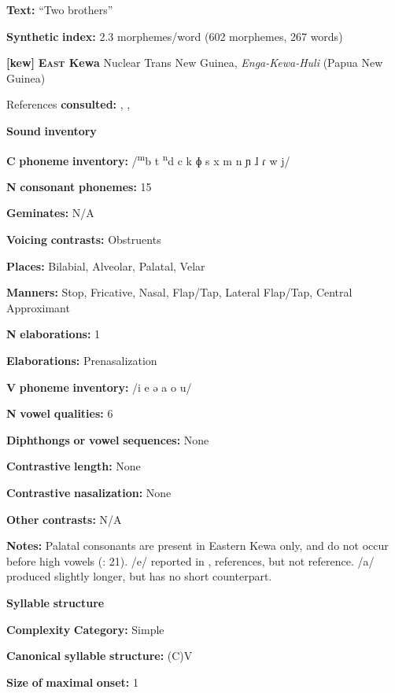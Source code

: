 \begin{styleBody}
\textbf{Text:} “Two brothers” \citep[92-97]{Vajda2004}

\textbf{Synthetic} \textbf{index:} 2.3 morphemes/word (602 morphemes, 267 words)

\textbf{[kew]}   \textbf{\textsc{East} \textbf{Kewa}}  Nuclear Trans New Guinea, \textit{Enga-Kewa-Huli} (Papua New Guinea)

References \textbf{consulted:} \citet{Franklin1971}, \citet{FranklinFranklin1962}, \citet{FranklinFranklin1978}

\textbf{Sound} \textbf{inventory}

\textbf{C} \textbf{phoneme} \textbf{inventory:} /\textsuperscript{m}b t \textsuperscript{n}d c k ɸ s x m n ɲ ɺ ɾ w j/

\textbf{N} \textbf{consonant} \textbf{phonemes:} 15

\textbf{Geminates:} N/A

\textbf{Voicing} \textbf{contrasts:} Obstruents

\textbf{Places:} Bilabial, Alveolar, Palatal, Velar

\textbf{Manners:} Stop, Fricative, Nasal, Flap/Tap, Lateral Flap/Tap, Central Approximant

\textbf{N} \textbf{elaborations:} 1

\textbf{Elaborations:} Prenasalization

\textbf{V} \textbf{phoneme} \textbf{inventory:} /i e ə a o u/

\textbf{N} \textbf{vowel} \textbf{qualities:} 6

\textbf{Diphthongs} \textbf{or} \textbf{vowel} \textbf{sequences:} None

\textbf{Contrastive} \textbf{length:} None

\textbf{Contrastive} \textbf{nasalization:} None

\textbf{Other} \textbf{contrasts:} N/A

\textbf{Notes:} Palatal consonants are present in Eastern Kewa only, and do not occur before high vowels (\citealt{FranklinFranklin1978}: 21). /e/ reported in ,  references, but not  reference. /a/ produced slightly longer, but has no short counterpart.

\textbf{Syllable} \textbf{structure}

\textbf{Complexity} \textbf{Category:} Simple

\textbf{Canonical} \textbf{syllable} \textbf{structure:} (C)V \citep[11-12]{Franklin1971}

\textbf{Size} \textbf{of} \textbf{maximal} \textbf{onset:} 1


\end{styleBody}
